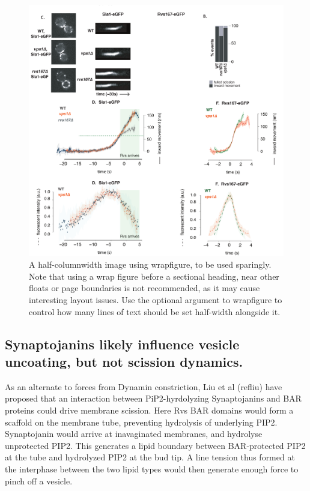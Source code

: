 \documentclass[9pt,lineno]{elife}
\begin{document}
\begin{figure}
	\includegraphics[width=\hsize]{figures/vpsdel_9}
	\caption{A half-columnwidth image using wrapfigure, to be used sparingly. Note that using a wrap figure before a sectional heading, near other floats or page boundaries is not recommended, as it may cause interesting layout issues. Use the optional argument to wrapfigure to control how many lines of text should be set half-width alongside it.}
	\label{fig:halfwidth}
\end{figure}

\subsection{Synaptojanins likely influence vesicle uncoating, but not scission dynamics.}

As an alternate to forces from Dynamin constriction, Liu et al (refliu) have proposed that an interaction between PiP2-hyrdolyzing Synaptojanins and BAR proteins could drive membrane scission. Here Rvs BAR domains would form a scaffold on the membrane tube, preventing hydrolysis of underlying PIP2. Synaptojanin would arrive at inavaginated membranes, and hydrolyse unprotected PIP2. This generates a lipid boundary between BAR-protected PIP2 at the tube and hydrolyzed PIP2 at the bud tip. A line tension thus formed at the interphase between the two lipid types would then generate enough force to pinch off a vesicle.
\end{document}

